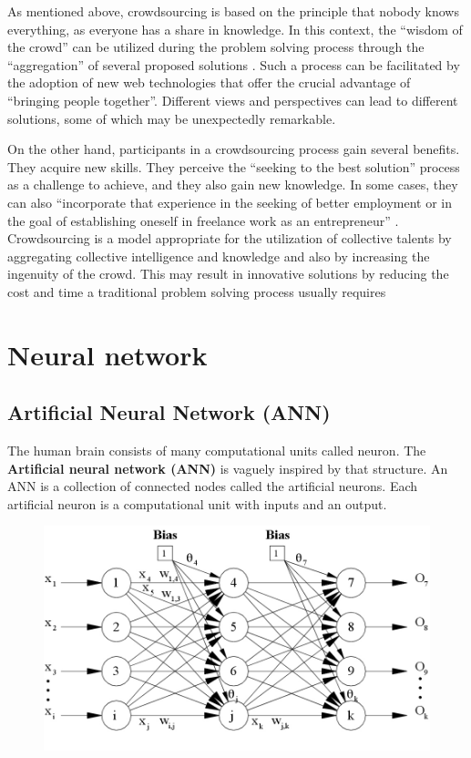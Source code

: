   As mentioned above, crowdsourcing is based on the principle that nobody knows everything, as everyone has a share in knowledge. In this context, the “wisdom of the crowd” can be utilized during the problem solving process through the “aggregation” of several proposed solutions \cite{doi101177}. Such a process can be facilitated by the adoption of new web technologies that offer the crucial advantage of “bringing people together”. Different views and perspectives can lead to different solutions, some of which may be unexpectedly remarkable.
  
  
  On the other hand, participants in a crowdsourcing process gain several benefits. They acquire new skills. They perceive the “seeking to the best solution” process as a challenge to achieve, and they also gain new knowledge. In some cases, they can also “incorporate that experience in the seeking of better employment or in the goal of establishing oneself in freelance work as an entrepreneur” \cite{doi101177}. Crowdsourcing is a model appropriate for the utilization of collective talents by aggregating collective intelligence and knowledge and also by increasing the ingenuity of the crowd. This may result in innovative solutions by reducing the cost and time a traditional problem solving process usually requires \cite{doi101177}

\section{Neural network}

\subsection{Artificial Neural Network (ANN)}
The human brain consists of many computational units called neuron. The \textbf{Artificial neural network (ANN)} is vaguely inspired by that structure. An ANN is a collection of connected nodes called the artificial neurons. Each artificial neuron is a computational unit with inputs and an output.
\begin{center}
	\begin{figure}[H]
		\centering
		\includegraphics[width=0.75\columnwidth]{images/chap2/NeuralNetwork.jpg}
		\label{chap2:neural_net}
	\end{figure}
\end{center}

